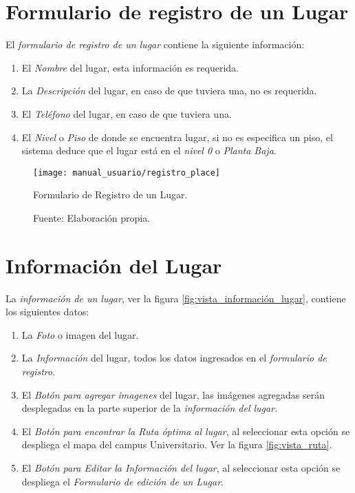 \section{Formulario de registro de un Lugar}

El \emph{formulario de registro de un lugar} contiene la siguiente información:
\begin{enumerate}
  \item El \emph{Nombre} del lugar, esta información es requerida.
  \item La \emph{Descripción} del lugar, en caso de que tuviera una, no es requerida.
  \item El \emph{Teléfono} del lugar, en caso de que tuviera una.
  \item El \emph{Nivel} o \emph{Piso} de donde se encuentra lugar, si no es especifica un piso, el sistema deduce que el lugar está en el \emph{nivel 0} o \emph{Planta Baja}.
\end{enumerate}

\begin{figure}[H]
      \begin{center}
        \texttt{[image: manual\_usuario/registro\_place]}

        \caption{Formulario de Registro de un Lugar.}
        \label{fig:vista_registro_place}
        \caption*{Fuente: Elaboración propia.}
      \end{center}
\end{figure}

\section{Información del Lugar}

La \emph{información de un lugar}, ver la figura \ref{fig:vista_información_lugar}, contiene los siguientes datos:
\begin{enumerate}
  \item La \emph{Foto} o imagen del lugar.
  \item La \emph{Información} del lugar, todos los datos ingresados en el \emph{formulario de registro}.
  \item El \emph{Botón para agregar imagenes} del lugar, las imágenes agregadas serán desplegadas en la parte superior de la \emph{información del lugar}.
  \item El \emph{Botón para encontrar la Ruta óptima al lugar}, al seleccionar esta opción se despliega el mapa del campus Universitario. Ver la figura \ref{fig:vista_ruta}.
  \item El \emph{Botón para Editar la Información del lugar}, al seleccionar esta opción se despliega el \emph{Formulario de edición de un Lugar}.
\end{enumerate}


